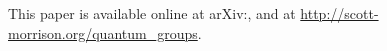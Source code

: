 \documentclass{gtart}
\begin{document}
\begin{abstract}
\end{abstract}

\maketitle

\tableofcontents


\newcommand{\urlprefix}{}



This paper is available online at arXiv:, and at
\url{http://scott-morrison.org/quantum_groups}.

\Addresses
\end{document}
